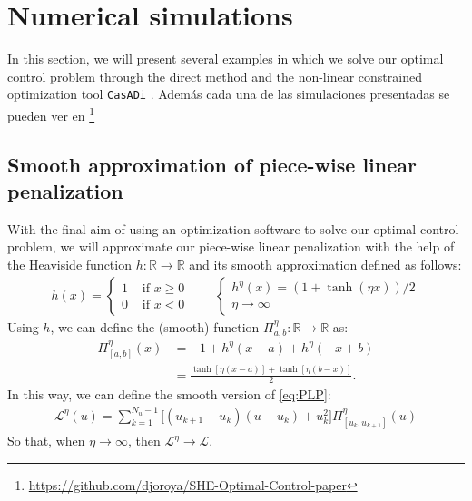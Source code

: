 \section{Numerical simulations}\label{sec:Simulations}

In this section, we will present several examples in which we solve our optimal control problem through the direct method and the non-linear constrained optimization tool \texttt{CasADi} \cite{Andersson2019}. Además cada una de las simulaciones presentadas se pueden ver en \footnote{\href{https://github.com/djoroya/SHE-Optimal-Control-paper}{https://github.com/djoroya/SHE-Optimal-Control-paper}}
%
\subsection{Smooth approximation of piece-wise linear penalization}

With the final aim of using an optimization software to solve our optimal control problem, we will approximate our piece-wise linear penalization with the help of the Heaviside function $h:\mathbb{R} \rightarrow \mathbb{R}$ and its smooth approximation defined as follows: 
\begin{gather}
    h(x) = \begin{cases}
        1 & \text{ if } x \geq 0 \\
        0 & \text{ if } x < 0
    \end{cases}    
    \hspace{2em} 
    \begin{cases}
        h^\eta(x) = (1 + \tanh(\eta x))/2   \\
        \eta \rightarrow \infty
    \end{cases}
\end{gather}
Using $h$, we can define the (smooth) function $\Pi_{a,b}^\eta:\mathbb{R} \rightarrow \mathbb{R}$ as:
\begin{align*}
    \Pi_{[a,b]}^\eta(x) &= - 1 + h^\eta(x-a) + h^\eta(-x+b) 
    \\
    &= \frac{\tanh[\eta( x -a)] + \tanh[\eta (b-x)]}{2}.
\end{align*}
In this way, we can define the smooth version of \eqref{eq:PLP}:
\begin{gather}
    \mathcal{L}^\eta(u) = \sum_{k = 1}^{N_u-1} \big[ (u_{k+1}+u_{k}) (u-u_k) + u_k^2 \big] \Pi^\eta_{[u_k,u_{k+1}]}(u)
\end{gather}
So that, when $\eta \rightarrow \infty$, then $\mathcal{L}^\eta \rightarrow \mathcal{L}$. 

